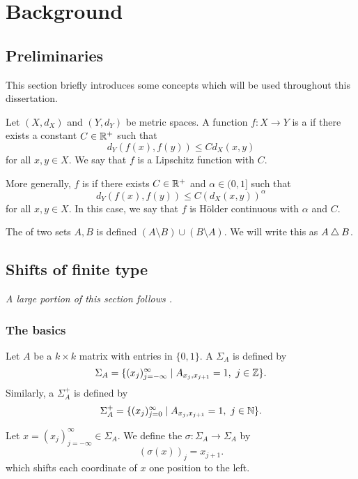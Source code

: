 \chapter{Background}
\section{Preliminaries}
This section briefly introduces some concepts which will be used throughout this dissertation.

\begin{definition}
	Let $(X, d_X)$ and $(Y, d_Y)$ be metric spaces. A function $f : X \to Y$ is a  if there exists a constant $C \in \mathbb{R}^+$ such that
	\[
	d_Y(f(x), f(y)) \leq Cd_X(x, y)
	\]
	for all $x, y \in X$. We say that $f$ is a Lipschitz function with  $C$.~\cite[p154]{searcoid:metric-spaces}
	
	More generally, $f$ is  if there exists $C \in \mathbb{R}^+$ and $\alpha \in (0, 1]$ such that
	\[
	d_Y(f(x), f(y)) \leq C(d_X(x, y))^\alpha
	\]
	for all $x, y \in X$. In this case, we say that $f$ is H\"older continuous with  $\alpha$ and  $C$.~\cite[p143]{brin-stuck:dynsys}
\end{definition}

\begin{definition}
	The  of two sets $A, B$ is defined $(A \setminus B) \cup (B \setminus A)$. We will write this as $A \bigtriangleup B$.
\end{definition}

\section{Shifts of finite type}
\emph{A large portion of this section follows \cite[Chapter 1]{parry-pollicott:zeta-fns-periodic-orbits}.}
\subsection{The basics}
Let $A$ be a $k \times k$ matrix with entries in $\{0, 1\}$. A  $\Sigma_A$ is defined by
\[
	\Sigma_A = \{(x_j)_{j = -\infty}^\infty \mid A_{x_j, x_{j + 1}} = 1,\ j \in \mathbb{Z}\}.
\]
Similarly, a  $\Sigma_A^+$ is defined by
\[
	\Sigma_A^+ = \{(x_j)_{j = 0}^\infty \mid A_{x_j, x_{j + 1}} = 1,\ j \in \mathbb{N}\}.
\]

Let $x = (x_j)_{j = -\infty}^\infty \in \Sigma_A$. We define the  $\sigma : \Sigma_A \to \Sigma_A$ by
\[
	(\sigma(x))_j = x_{j + 1}.
\]
which shifts each coordinate of $x$ one position to the left.

